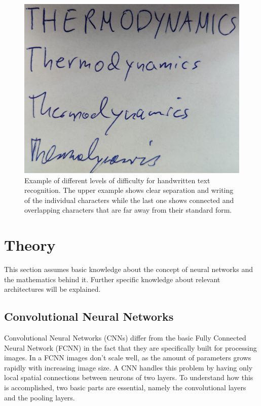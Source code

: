 \documentclass{article}
\begin{document}
\begin{figure}[h]
\begin{center}
\includegraphics[scale=0.4]{text_example2}
\end{center}
\caption{Example of different levels of difficulty for handwritten text recognition. The upper example shows clear separation and writing of the individual characters while the last one shows connected and overlapping characters that are far away from their standard form.}
\label{fig:SampleData}
\end{figure}

\newpage
\section{Theory}
This section assumes basic knowledge about the concept of neural networks and the mathematics behind it. Further specific knowledge about relevant architectures will be explained.

\subsection{Convolutional Neural Networks}
Convolutional Neural Networks (CNNs) differ from the basic Fully Connected Neural Network (FCNN) in the fact that they are specifically built for processing images. In a FCNN images don't scale well, as the amount of parameters grows rapidly with increasing image size. A CNN handles this problem by having only local spatial connections between neurons of two layers. To understand how this is accomplished, two basic parts are essential, namely the convolutional layers and the pooling layers\cite{Goodfellow1}\cite{Stanford}.
\end{document}

